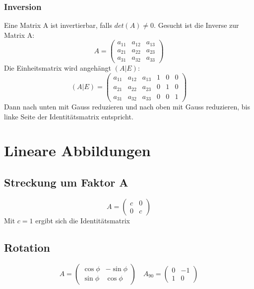 \documentclass{report}
\begin{document}
\subsection{Inversion}
Eine Matrix A ist invertierbar, falls $det(A) \neq 0$. Gesucht ist die Inverse zur Matrix A:
\begin{equation}A=\left(\begin{matrix}a_{11} & a_{12} & a_{13}\\a_{21} & a_{22} & a_{23}\\a_{31} & a_{32} & a_{33}\end{matrix}\right)\end{equation}
Die Einheitsmatrix wird angehängt $(A|E)$:
\begin{equation}(A|E)=\left(\begin{matrix}a_{11} & a_{12} & a_{13} & 1 & 0 & 0\\a_{21} & a_{22} & a_{23} & 0 & 1 & 0\\a_{31} & a_{32} & a_{33} & 0 & 0 & 1\end{matrix}\right)\end{equation}
Dann nach unten mit Gauss reduzieren und nach oben mit Gauss reduzieren, bis linke Seite der Identitätsmatrix entspricht.
\chapter{Lineare Abbildungen}
\section{Streckung um Faktor A}
\begin{equation}A=\left(\begin{matrix}c & 0\\0 & c\end{matrix}\right)\end{equation}
Mit $c = 1$ ergibt sich die Identitätsmatrix
\section{Rotation}
\begin{equation}A=\left(\begin{matrix}\cos{\phi} & -\sin{\phi}\\\sin{\phi} & \cos{\phi}\end{matrix}\right) \quad A_{90}=\left(\begin{matrix}0 & -1\\1 & 0\end{matrix}\right) \end{equation}
\end{document}
